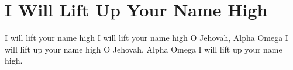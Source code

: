 \chapter{I Will Lift Up Your Name High}
\starttocol
\startlines
I {\sc will} lift your name high
I will lift your name high
O Jehovah, Alpha Omega
I will lift up your name high
O Jehovah, Alpha Omega
I will lift up your name high.
\stoplines
\nexttocol

\stoptocol
